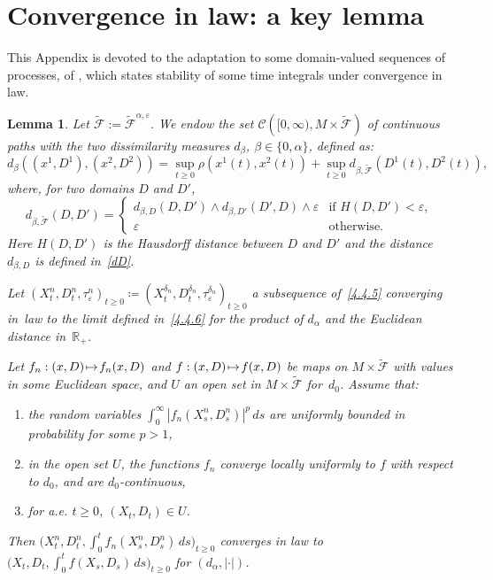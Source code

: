 \documentclass[JEP,XML,SOM,Unicode,NoFloatCountersInSection,published]{cedram}
\newcommand\mto{\mathchoice{\longmapsto}{\mapsto}{\mapsto}{\mapsto}}
\newenvironment{enumeratei}
{\bgroup\def\theenumi{\roman{enumi}}\def\theenumii{\arabic{enumii}}\begin{enumerate}}
{\end{enumerate}\egroup}
\theoremstyle{plain}
\newtheorem{lemma}[thm]{Lemma}
\theoremstyle{definition}
\newcommand{\RR}{{\mathbb R}}
\newcommand{\SC}{{\mathscr C}}
\newcommand{\SF}{{\mathscr F}}
\newcommand\df{\coloneqq}
\let\di\displaystyle
\let\a\alpha
\let\b\beta
\let\d\delta
\let\e\varepsilon
\begin{document}
\section{Convergence in law: a key lemma}\label{appH}

This Appendix is devoted to the adaptation to some domain-valued sequences of processes, of \cite[Lem.\,4]{Zheng:85}, which states stability of some time integrals under convergence in law.
\begin{lemma}
\label{Zheng}
Let $\tilde\SF:=\tilde \SF^{\a,\e}$. We endow the set $\di \SC\left([0,\infty), M\times \tilde\SF\right)$ of continuous paths with the two dissimilarity measures $d_\b$, $\b\in\{0,\a\}$, defined as:\vspace*{-3pt}
\begin{equation}
d_\b\left((x^1,D^1), (x^2,D^2)\right)=\sup_{t\ge 0}\rho(x^1(t),x^2(t))+\sup_{t\ge 0} d_{\b,\tilde\SF} (D^1(t), D^2(t)),
\end{equation}
where, for two domains $D$ and $D'$,\vspace*{-3pt}
\begin{equation}%
d_{\b,\tilde\SF}(D,D')=
\begin{cases}
d_{\b,D}(D,D') \wedge d_{\b,D'}(D',D)
\wedge\e&\text{if } H(D,D')<\e,\\
\e & \text{otherwise.}
\end{cases}
\end{equation}
Here $H(D,D')$ is the Hausdorff distance between $D$ and $D'$ and the distance $d_{\b,D}$ is defined in~\eqref{dD}.

Let $\di (X_t^n,D_t^n,\tau_\e^n)_{t\ge 0}\!\df\!(X_t^{\d_n},D_t^{\d_n},\tau_\e^{\d_n})_{t\ge 0}$ a subsequence of~\eqref{4.4.5} converging in~law to the limit defined in~\eqref{4.4.6} for the product of $d_\a$ and the Euclidean distance in~$\RR_+$.

Let $f_n:(x,D)\!\mto\! f_n(x,D)$ and $f:(x,D)\!\mto\! f(x,D)$ be maps on $M\times \tilde\SF$ with values in some Euclidean space, and $U$ an open set in $M\times \tilde\SF$ for~$d_0$. Assume that:
\begin{enumeratei}
\item\label{Zhengi} the random variables $\int_0^\infty |f_n(X_s^n,D_s^n)|^p\, ds $ are uniformly bounded in probability for some $p>1$,
\item\label{Zhengii} in the open set $U$, the functions $f_n$ converge locally uniformly to $f$ with respect to $d_0$, and are $d_0$-continuous,
\item\label{Zhengiii} for a.e. $t\geq 0$, $(X_t,D_t)\in U$.
\end{enumeratei}
\noindent
Then $\bigl(X_t^n, D_t^n,\int_0^t f_n(X_s^n, D_s^n)\, ds\bigr)_{t\ge 0}$ converges in law to $\bigl(X_t, D_t,\int_0^t f(X_s, D_s)\, ds\bigr)_{t\ge 0}$ for $(d_\a,|\cdot|)$.
\end{lemma}
\end{document}
